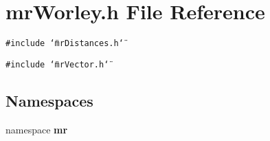 \section{mr\-Worley.h File Reference}
\label{mrWorley_8h}
{\tt \#include \char`\"{}mr\-Distances.h\char`\"{}}\par
{\tt \#include \char`\"{}mr\-Vector.h\char`\"{}}\par
\subsection*{Namespaces}
\begin{CompactItemize}
\item 
namespace {\bf mr}
\end{CompactItemize}
